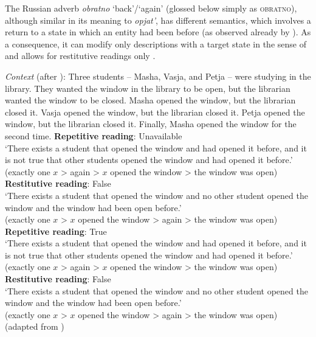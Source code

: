 \documentclass[output=paper]{langscibook}
\begin{document}
The Russian adverb \textit{obratno} ‘back’/‘again’ (glossed below simply as \textsc{obratno}), although similar in its meaning to \textit{opjat’}, has different semantics, which involves a return to a state in which an entity had been before (as observed already by \citealt{Tatevosov2016}). As a consequence, it can modify only descriptions with a target state in the sense of \citep{Kratzer2000} and allows for restitutive readings only .


 \ea\label{ex:bondarenko:19}
\textit{Context} (after \citealt{Lechner-etal2015}): Three students -- Masha, Vasja, and Petja -- were studying in the library. They wanted the window in the library to be open, but the librarian wanted the window to be closed. Masha opened the window, but the librarian closed it. Vasja opened the window, but the librarian closed it. Petja opened the window, but the librarian closed it. Finally, Masha opened the window for the second time.
\ea \textbf{Repetitive reading}: Unavailable\\
`There exists a student that opened the window and had opened it before, and it is not true that other students opened the window and had opened it before.'\\\hfill{\small (exactly one $x$ > again > $x$ opened the window > the window was open)}
\ex \textbf{Restitutive reading}: False\\
`There exists a student that opened the window and no other student opened the window and the window had been open before.'\\\hfill {\small (exactly one $x$ > $x$ opened the window > again > the window was open)}
\z
{}\label{ex:bondarenko:19b}
\ea \textbf{Repetitive reading}: True\label{ex:bondarenko:19c}\\
`There exists a student that opened the window and had opened it before, and it is not true that other students opened the window and had opened it before.'\\\hfill{\small (exactly one $x$ > again > $x$ opened the window > the window was open)}
\ex \textbf{Restitutive reading}: False\label{ex:bondarenko:19d}\\
`There exists a student that opened the window and no other student opened the window and the window had been open before.'\\\hfill {\small (exactly one $x$ > $x$ opened the window > again > the window was open)}\\
\hfill (adapted from \citealt[31]{Tatevosov2016})
\z
\z\z
\end{document}
